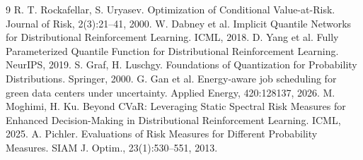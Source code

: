 \documentclass[a4paper,twocolumn,10pt]{jsarticle}
\begin{document}
\begin{thebibliography}{9}
\fontsize{6pt}{7.2pt}\selectfont
\setlength{\itemsep}{-0.8pt}
\setlength{\parskip}{0pt}
 R. T. Rockafellar, S. Uryasev. Optimization of Conditional Value-at-Risk. Journal of Risk, 2(3):21--41, 2000.
 W. Dabney et al. Implicit Quantile Networks for Distributional Reinforcement Learning. ICML, 2018.
 D. Yang et al. Fully Parameterized Quantile Function for Distributional Reinforcement Learning. NeurIPS, 2019.
 S. Graf, H. Luschgy. Foundations of Quantization for Probability Distributions. Springer, 2000.
 G. Gan et al. Energy-aware job scheduling for green data centers under uncertainty. Applied Energy, 420:128137, 2026.
 M. Moghimi, H. Ku. Beyond CVaR: Leveraging Static Spectral Risk Measures for Enhanced Decision-Making in Distributional Reinforcement Learning. ICML, 2025.
 A. Pichler. Evaluations of Risk Measures for Different Probability Measures. SIAM J. Optim., 23(1):530--551, 2013.
\end{thebibliography}
\end{document}
